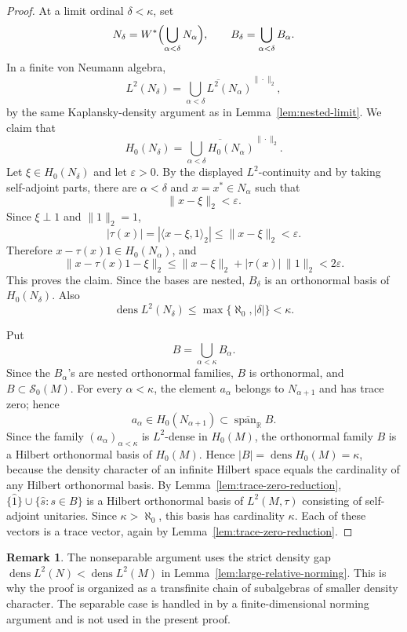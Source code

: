 \documentclass[11pt,letterpaper,reqno]{amsart}
\theoremstyle{definition}
\newtheorem{rem}[thm]{Remark}
\numberwithin{equation}{section}
\newcommand{\RR}{\mathbb R}
\newcommand{\one}{1}
\DeclareMathOperator{\spanop}{span}
\DeclareMathOperator{\dens}{dens}
\begin{document}
\begin{proof}
At a limit ordinal $\delta<\kappa$, set
\[
   N_\delta=W^*\Bigl(\bigcup_{\alpha<\delta}N_\alpha\Bigr),
   \qquad
   B_\delta=\bigcup_{\alpha<\delta}B_\alpha.
\]
In a finite von Neumann algebra,
\[
   L^2(N_\delta)=
   \overline{\bigcup_{\alpha<\delta}L^2(N_\alpha)}^{\|\cdot\|_2},
\]
by the same Kaplansky-density argument as in Lemma~\ref{lem:nested-limit}.
We claim that
\[
   H_0(N_\delta)
   =
   \overline{\bigcup_{\alpha<\delta}H_0(N_\alpha)}^{\|\cdot\|_2}.
\]
Let \(\xi\in H_0(N_\delta)\) and let \(\varepsilon>0\).  By the displayed
\(L^2\)-continuity and by taking self-adjoint parts, there are
\(\alpha<\delta\) and \(x=x^*\in N_\alpha\) such that
\[
   \|x-\xi\|_2<\varepsilon.
\]
Since \(\xi\perp\one\) and \(\|\one\|_2=1\),
\[
   |\tau(x)|
   =
   |\langle x-\xi,\one\rangle_2|
   \leq \|x-\xi\|_2
   <\varepsilon.
\]
Therefore \(x-\tau(x)\one\in H_0(N_\alpha)\), and
\[
   \|x-\tau(x)\one-\xi\|_2
   \leq
   \|x-\xi\|_2+|\tau(x)|\,\|\one\|_2
   <2\varepsilon.
\]
This proves the claim.
Since the bases are nested, $B_\delta$ is an orthonormal basis of $H_0(N_\delta)$.  Also
\[
   \dens L^2(N_\delta)\leq\max\{\aleph_0,|\delta|\}<\kappa.
\]

Put
\[
   B=\bigcup_{\alpha<\kappa}B_\alpha .
\]
Since the \(B_\alpha\)'s are nested orthonormal families, \(B\) is orthonormal, and \(B\subset\mathcal S_0(M)\).
For every $\alpha<\kappa$, the element $a_\alpha$ belongs to $N_{\alpha+1}$ and has trace zero; hence
\[
   a_\alpha\in H_0(N_{\alpha+1})\subset\overline{\spanop_{\RR}}B.
\]
Since the family $(a_\alpha)_{\alpha<\kappa}$ is $L^2$-dense in $H_0(M)$, the orthonormal family $B$ is a Hilbert orthonormal basis of $H_0(M)$.  Hence
\(|B|=\dens H_0(M)=\kappa\), because the density character of an infinite
Hilbert space equals the cardinality of any Hilbert orthonormal basis.  By
Lemma~\ref{lem:trace-zero-reduction}, $\{\widehat{\one}\}\cup\{\widehat{s}:s\in B\}$ is a Hilbert orthonormal
basis of $L^2(M,\tau)$ consisting of self-adjoint unitaries.  Since
\(\kappa>\aleph_0\), this basis has cardinality \(\kappa\).  Each of these
vectors is a trace vector, again by Lemma~\ref{lem:trace-zero-reduction}.
\end{proof}

\begin{rem}\label{rem:nonsep-density-gap}
The nonseparable argument uses the strict density gap
$\dens L^2(N)<\dens L^2(M)$ in Lemma~\ref{lem:large-relative-norming}.
This is why the proof is organized as a transfinite chain of subalgebras of
smaller density character.  The separable case is handled in \cite{HTZ26}
by a finite-dimensional norming argument and is not used in the present proof.
\end{rem}
\end{document}
